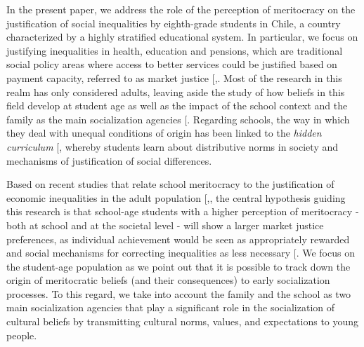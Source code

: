 \documentclass[
  12pt,
  letterpaper,
]{article}
\begin{document}
In the present paper, we address the role of the perception of
meritocracy on the justification of social inequalities by eighth-grade
students in Chile, a country characterized by a highly stratified
educational system. In particular, we focus on justifying inequalities
in health, education and pensions, which are traditional social policy
areas where access to better services could be justified based on
payment capacity, referred to as market justice
{[},\citeproc{ref-lindh_bringing_2023}{10}{]}.
Most of the research in this realm has only considered adults, leaving
aside the study of how beliefs in this field develop at student age as
well as the impact of the school context and the family as the main
socialization agencies {[}\citeproc{ref-batruch_belief_2022}{3}{]}.
Regarding schools, the way in which they deal with unequal conditions of
origin has been linked to the \emph{hidden curriculum}
{[}\citeproc{ref-chafel_schooling_1997}{11}{]}, whereby students learn
about distributive norms in society and mechanisms of justification of
social differences.

Based on recent studies that relate school meritocracy to the
justification of economic inequalities in the adult population
{[},\citeproc{ref-wiederkehr_belief_2015}{4}{]},
the central hypothesis guiding this research is that school-age students
with a higher perception of meritocracy - both at school and at the
societal level - will show a larger market justice preferences, as
individual achievement would be seen as appropriately rewarded and
social mechanisms for correcting inequalities as less necessary
{[}\citeproc{ref-batruch_belief_2022}{3}{]}. We focus on the student-age
population as we point out that it is possible to track down the origin
of meritocratic beliefs (and their consequences) to early socialization
processes. To this regard, we take into account the family and the
school as two main socialization agencies that play a significant role
in the socialization of cultural beliefs by transmitting cultural norms,
values, and expectations to young people.
\end{document}
